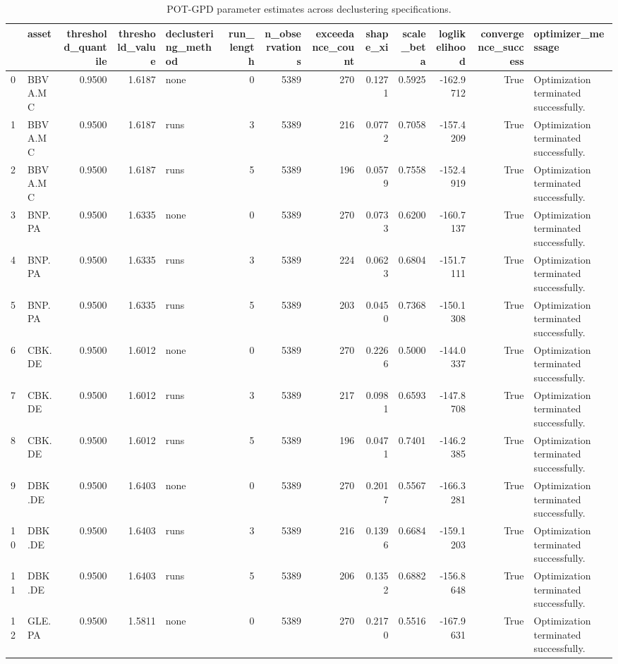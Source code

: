 \begin{table}
\caption{POT-GPD parameter estimates across declustering specifications.}
\label{tab:evt_gpd_params_declustering_robustness}
\begin{tabular}{llrrlrrrrrrrl}
\toprule
 & asset & threshold_quantile & threshold_value & declustering_method & run_length & n_observations & exceedance_count & shape_xi & scale_beta & loglikelihood & convergence_success & optimizer_message \\
\midrule
0 & BBVA.MC & 0.9500 & 1.6187 & none & 0 & 5389 & 270 & 0.1271 & 0.5925 & -162.9712 & True & Optimization terminated successfully. \\
1 & BBVA.MC & 0.9500 & 1.6187 & runs & 3 & 5389 & 216 & 0.0772 & 0.7058 & -157.4209 & True & Optimization terminated successfully. \\
2 & BBVA.MC & 0.9500 & 1.6187 & runs & 5 & 5389 & 196 & 0.0579 & 0.7558 & -152.4919 & True & Optimization terminated successfully. \\
3 & BNP.PA & 0.9500 & 1.6335 & none & 0 & 5389 & 270 & 0.0733 & 0.6200 & -160.7137 & True & Optimization terminated successfully. \\
4 & BNP.PA & 0.9500 & 1.6335 & runs & 3 & 5389 & 224 & 0.0623 & 0.6804 & -151.7111 & True & Optimization terminated successfully. \\
5 & BNP.PA & 0.9500 & 1.6335 & runs & 5 & 5389 & 203 & 0.0450 & 0.7368 & -150.1308 & True & Optimization terminated successfully. \\
6 & CBK.DE & 0.9500 & 1.6012 & none & 0 & 5389 & 270 & 0.2266 & 0.5000 & -144.0337 & True & Optimization terminated successfully. \\
7 & CBK.DE & 0.9500 & 1.6012 & runs & 3 & 5389 & 217 & 0.0981 & 0.6593 & -147.8708 & True & Optimization terminated successfully. \\
8 & CBK.DE & 0.9500 & 1.6012 & runs & 5 & 5389 & 196 & 0.0471 & 0.7401 & -146.2385 & True & Optimization terminated successfully. \\
9 & DBK.DE & 0.9500 & 1.6403 & none & 0 & 5389 & 270 & 0.2017 & 0.5567 & -166.3281 & True & Optimization terminated successfully. \\
10 & DBK.DE & 0.9500 & 1.6403 & runs & 3 & 5389 & 216 & 0.1396 & 0.6684 & -159.1203 & True & Optimization terminated successfully. \\
11 & DBK.DE & 0.9500 & 1.6403 & runs & 5 & 5389 & 206 & 0.1352 & 0.6882 & -156.8648 & True & Optimization terminated successfully. \\
12 & GLE.PA & 0.9500 & 1.5811 & none & 0 & 5389 & 270 & 0.2170 & 0.5516 & -167.9631 & True & Optimization terminated successfully. \\

\end{tabular}
\end{table}
